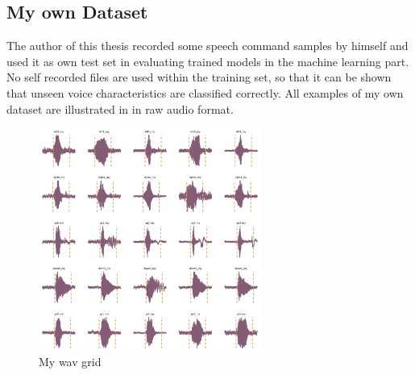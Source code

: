 
\subsection{My own Dataset}\label{sec:exp_dataset_my}
The author of this thesis recorded some speech command samples by himself and used it as own test set in evaluating trained models in the machine learning part. No self recorded files are used within the training set, so that it can be shown that unseen voice characteristics are classified correctly.
All examples of my own dataset are illustrated in  in raw audio format.

\begin{figure}[!ht]
  \centering
    \includegraphics[width=0.65\textwidth]{./5_exp/figs/exp_dataset_wav_grid_my}
  \caption{My wav grid}
  \label{fig:exp_dataset_wav_grid_my}
\end{figure}
\FloatBarrier
\noindent